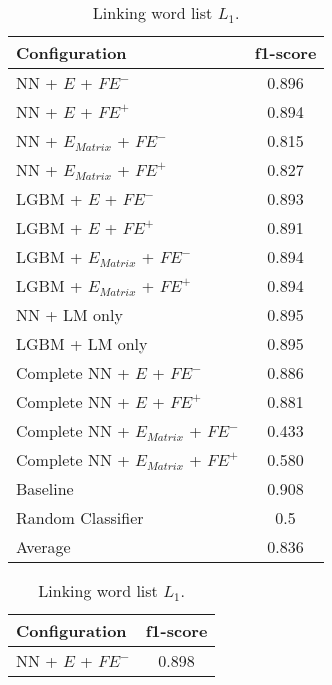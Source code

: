 \begin{table}[h]
  	\tiny
  	\centering
	\begin{subtable}{.5\textwidth}
		\centering
  		\renewcommand{\arraystretch}{1.4}
   		\begin{tabular}{|| l || c ||}
   			\hline
   			{Configuration} & {f1-score} \\
   			\hline\hline
   			NN + $E$ + $\textit{FE}^-$ &  0.896 \\
 			\hline
 			NN + $E$ + $\textit{FE}^+$ & 0.894 \\
 			\hline
 			NN + $E_{Matrix}$ + $\textit{FE}^-$ & 0.815 \\
 			\hline
 			NN + $E_{Matrix}$ + $\textit{FE}^+$ & 0.827 \\
 			\hline
 			LGBM + $E$ + $\textit{FE}^-$ & 0.893 \\
 			\hline
 			LGBM + $E$ + $\textit{FE}^+$ & 0.891 \\
 			\hline
 			LGBM + $E_{Matrix}$ + $\textit{FE}^-$ & 0.894 \\
 			\hline
 			LGBM + $E_{Matrix}$ + $\textit{FE}^+$ & 0.894 \\
 			\hline
 			NN + LM only & 0.895 \\
 			\hline
 			LGBM + LM only & 0.895 \\
 			\hline
 			Complete NN + $E$ + $\textit{FE}^-$ & 0.886 \\
 			\hline
 			Complete NN + $E$ + $\textit{FE}^+$ & 0.881 \\
 			\hline
 			Complete NN + $E_{Matrix}$ + $\textit{FE}^-$ & 0.433 \\
 			\hline
 			Complete NN + $E_{Matrix}$ + $\textit{FE}^+$ & 0.580 \\
 			\hline
 			Baseline & 0.908 \\
 			\hline
 			Random Classifier & 0.5 \\
 			\hline
 			\hline
 			Average & 0.836 \\
 			\hline
		\end{tabular}
		\renewcommand{\arraystretch}{1}
  		\caption{Linking word list $L_1$.}%
  	\end{subtable}%
  	\begin{subtable}{.5\textwidth}
		\centering
  		\renewcommand{\arraystretch}{1.4}
   		\begin{tabular}{|| l || c ||}
   			\hline
   			{Configuration} & {f1-score} \\
   			\hline\hline
   			NN + $E$ + $\textit{FE}^-$ &  0.898 \\
 			\hline

\end{tabular}
\end{subtable}
\end{table}

